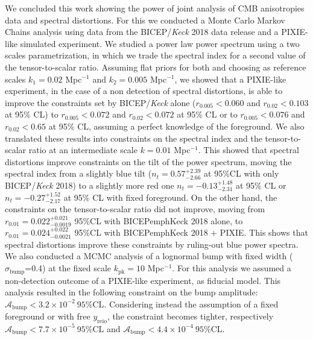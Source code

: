 We concluded this work showing the power of joint analysis of CMB anisotropies data and spectral distortions. For this we conducted a Monte Carlo Markov Chains analysis using data from the BICEP/\emph{Keck} 2018 data release and a PIXIE-like simulated experiment. We studied a power law power spectrum using a two scales parametrization, in which we trade the spectral index for a second value of the tensor-to-scalar ratio. Assuming flat priors for both and choosing as reference scales $k_1=0.02$ Mpc$^{-1}$ and $k_2=0.005$ Mpc$^{-1}$, we showed that a PIXIE-like experiment, in the case of a non detection of spectral distortions, is able to improve the constraints set by BICEP/\emph{Keck} alone ($r_{0.005}<0.060$ and $r_{0.02}<0.103$ at 95\% CL) to $r_{0.005}<0.072$ and $r_{0.02}<0.072$ at 95\% CL or to $r_{0.005}<0.076$ and $r_{0.02}<0.65$ at 95\% CL, assuming a perfect knowledge of the foreground. We also translated these results into constraints on the spectral index and the tensor-to-scalar ratio at an intermediate scale $k=0.01$ Mpc$^{-1}$. This showed that spectral distortions improve constraints on the tilt of the power spectrum, moving the spectral index from a slightly blue tilt ($n_t=0.57^{+2.39}_{-2.66}$ at 95\%CL with only BICEP/\emph{Keck} 2018) to a slightly more red one $n_t=-0.13^{+1.48}_{-2.31}$ at 95\% CL or $n_t=-0.27^{+1.52}_{-2.17}$ at 95\% CL with fixed foreground. On the other hand, the constraints on the tensor-to-scalar ratio did not improve, moving from $r_{0.01}=0.022^{+0.021}_{-0.0019}$ 95\%CL with BICEP\/emph{Keck} 2018 alone, to $r_{0.01}=0.024^{+0.022}_{-0.0021}$ 95\%CL with BICEP\/emph{Keck} 2018 + PIXIE. This shows that spectral distortions improve these constraints by ruling-out blue power spectra. \\ We also conducted a MCMC analysis of a lognormal bump with fixed width ($\sigma_\text{bump}$=0.4) at the fixed scale $k_\text{pk}=10$ Mpc$^{-1}$. For this analysis we assumed a non-detection outcome of a PIXIE-like experiment, as fiducial model. This analysis resulted in the following constraint on the bump amplitude: $\mathcal A_\text{bump}<3.2\times10^{-2}\ 95\%$CL. Considering instead the assumption of a fixed foreground or with free $y_\text{reio}$, the constraint becomes tighter, respectively $\mathcal A_\text{bump}<7.7\times10^{-5}\ 95\%$CL and $\mathcal A_\text{bump}<4.4\times10^{-4}\ 95\%$CL.

